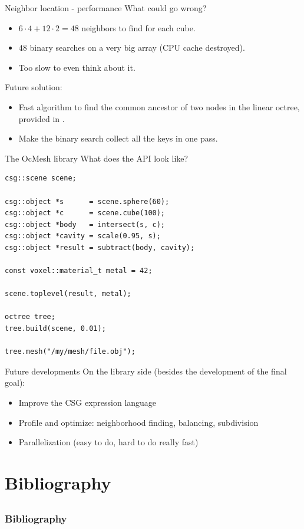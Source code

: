 \documentclass[utf8x]{beamer}
\begin{document}
\begin{frame}{Neighbor location - performance}
What could go wrong?
\begin{itemize}
\item $6 \cdot 4 + 12 \cdot 2=48$ neighbors to find for each cube.
\item $48$ binary searches on a very big array (CPU cache destroyed).
\item Too slow to even think about it.
\end{itemize}
Future solution:
\begin{itemize}
\item Fast algorithm to find the common ancestor of two nodes in the linear 
      octree, provided in \cite{Yoder2006}.
\item Make the binary search collect all the keys in one pass.
\end{itemize}
\end{frame}

\begin{frame}[fragile]{The OcMesh library}
What does the API look like?
\begin{lstlisting}
csg::scene scene;

csg::object *s      = scene.sphere(60);
csg::object *c      = scene.cube(100);
csg::object *body   = intersect(s, c);
csg::object *cavity = scale(0.95, s);
csg::object *result = subtract(body, cavity);

const voxel::material_t metal = 42;

scene.toplevel(result, metal);

octree tree;
tree.build(scene, 0.01);

tree.mesh("/my/mesh/file.obj");
\end{lstlisting}
\end{frame}

\begin{frame}{Future developments}
On the library side (besides the development of the final goal):
\begin{itemize}
\item Improve the CSG expression language
\item Profile and optimize: neighborhood finding, balancing, subdivision
\item Parallelization (easy to do, hard to do really fast)
\end{itemize}
\end{frame}

\section{Bibliography}
\subsection{}
\begin{frame}[allowframebreaks]
\frametitle{Bibliography}
\begin{center}


\end{center}
\end{frame}
\end{document}

